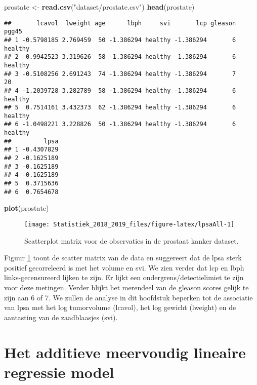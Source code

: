 \documentclass[12pt,dutch,coursenotes]{book}
\newenvironment{Shaded}{\begin{snugshade}}{\end{snugshade}}
\newcommand{\KeywordTok}[1]{\textcolor[rgb]{0.13,0.29,0.53}{\textbf{#1}}}
\newcommand{\StringTok}[1]{\textcolor[rgb]{0.31,0.60,0.02}{#1}}
\newcommand{\NormalTok}[1]{#1}
\theoremstyle{definition}
\theoremstyle{definition}
\theoremstyle{definition}
\theoremstyle{remark}
\begin{document}
\begin{Shaded}
\begin{Highlighting}[]
\NormalTok{prostate <-}\StringTok{ }\KeywordTok{read.csv}\NormalTok{(}\StringTok{"dataset/prostate.csv"}\NormalTok{)}
\KeywordTok{head}\NormalTok{(prostate)}
\end{Highlighting}
\end{Shaded}

\begin{verbatim}
##       lcavol  lweight age      lbph     svi       lcp gleason   pgg45
## 1 -0.5798185 2.769459  50 -1.386294 healthy -1.386294       6 healthy
## 2 -0.9942523 3.319626  58 -1.386294 healthy -1.386294       6 healthy
## 3 -0.5108256 2.691243  74 -1.386294 healthy -1.386294       7      20
## 4 -1.2039728 3.282789  58 -1.386294 healthy -1.386294       6 healthy
## 5  0.7514161 3.432373  62 -1.386294 healthy -1.386294       6 healthy
## 6 -1.0498221 3.228826  50 -1.386294 healthy -1.386294       6 healthy
##         lpsa
## 1 -0.4307829
## 2 -0.1625189
## 3 -0.1625189
## 4 -0.1625189
## 5  0.3715636
## 6  0.7654678
\end{verbatim}

\begin{Shaded}
\begin{Highlighting}[]
\KeywordTok{plot}\NormalTok{(prostate)}
\end{Highlighting}
\end{Shaded}

\begin{figure}

{\centering \texttt{[image: Statistiek\_2018\_2019\_files/figure-latex/lpsaAll-1]} 

}

\caption{Scatterplot matrix voor de observaties in de prostaat kanker dataset.}\label{fig:lpsaAll}
\end{figure}

Figuur \ref{fig:lpsaAll} toont de scatter matrix van de data en
suggereert dat de lpsa sterk positief gecorreleerd is met het volume en
svi. We zien verder dat lcp en lbph links-gecensureerd lijken te zijn.
Er lijkt een ondergrens/detectielimiet te zijn voor deze metingen.
Verder blijkt het merendeel van de gleason scores gelijk te zijn aan 6
of 7. We zullen de analyse in dit hoofdstuk beperken tot de associatie
van lpsa met het log tumorvolume (lcavol), het log gewicht (lweight) en
de aantasting van de zaadblaasjes (svi).

\section{Het additieve meervoudig lineaire regressie
model}\label{het-additieve-meervoudig-lineaire-regressie-model}
\end{document}
